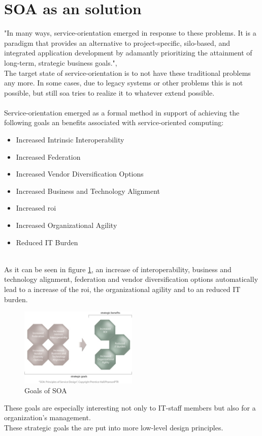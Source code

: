 \documentclass[12pt]{article}
\begin{document}
\section{SOA as an solution} 
"In many ways, service-orientation emerged in response to these problems. It is a paradigm that provides an alternative to project-specific, silo-based, and integrated application development by adamantly prioritizing the attainment of long-term, strategic business goals.",\cite[page 522]{grau} \\
The target state of service-orientation is to not have these traditional problems any more. In some cases, due to legacy systems or other problems this is not possible, but still \gls{soa} tries to realize it to whatever extend possible.
\\ \\
Service-orientation emerged as a formal method in support of achieving the following goals an benefits associated with service-oriented computing: \\
\begin{itemize}
\item Increased Intrinsic Interoperability
\item Increased Federation
\item Increased Vendor Diversification Options 
\item Increased Business and Technology Alignment
\item Increased \gls{roi}
\item Increased Organizational Agility
\item Reduced IT Burden
\end{itemize} \cite[page 23]{grau}\\
As it can be seen in figure \ref{fig:goalssoa}, an increase of interoperability,  business and technology alignment, federation and vendor diversification options automatically lead to a increase of the \gls{roi}, the organizational agility and to an reduced IT burden.
\begin{figure}[here!]
	\centering
	\includegraphics[width=0.5\textwidth]{images/page24}
	\caption{Goals of SOA\cite{photos}}
	\label{fig:goalssoa}
	\end{figure}
\FloatBarrier
 \noindent
These goals are especially interesting not only to IT-staff members but also for a organization's management. \\
These strategic goals the are put into more low-level design principles.
\end{document}
